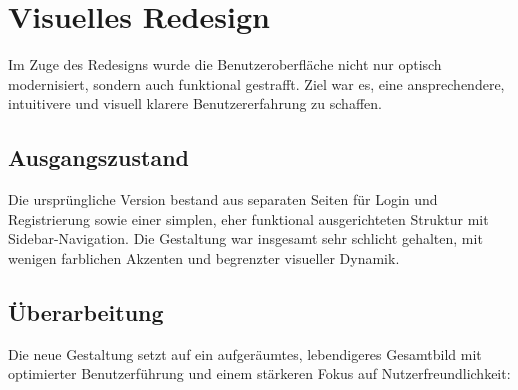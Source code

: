 \section{Visuelles Redesign}\label{sec:visuelles-redesign}

Im Zuge des Redesigns wurde die Benutzeroberfläche nicht nur optisch modernisiert, sondern auch funktional gestrafft.
Ziel war es, eine ansprechendere, intuitivere und visuell klarere Benutzererfahrung zu schaffen.


\subsection{Ausgangszustand}\label{subsec:visuelles-redesign-ausgang}

Die ursprüngliche Version bestand aus separaten Seiten für Login und Registrierung sowie einer simplen, eher funktional ausgerichteten Struktur mit Sidebar-Navigation. Die Gestaltung war insgesamt sehr schlicht gehalten, mit wenigen farblichen Akzenten und begrenzter visueller Dynamik.

\subsection{Überarbeitung}\label{subsec:visuelles-redesign-overhaul}

Die neue Gestaltung setzt auf ein aufgeräumtes, lebendigeres Gesamtbild mit optimierter Benutzerführung und einem stärkeren Fokus auf Nutzerfreundlichkeit:

